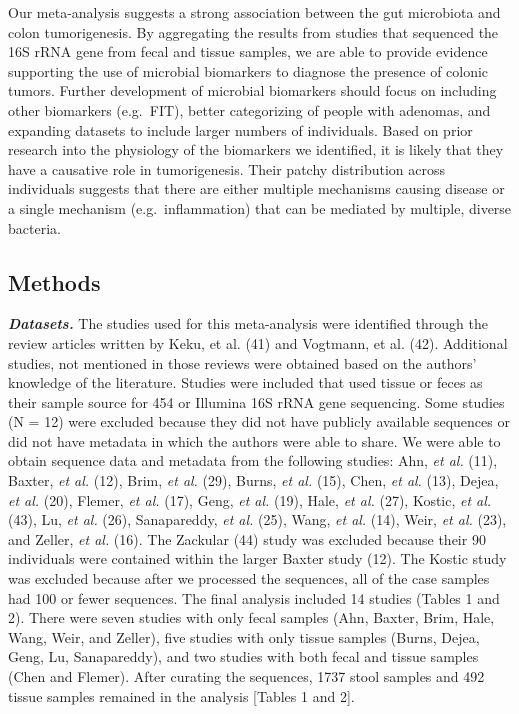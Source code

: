 \documentclass[12pt,]{article}
\begin{document}
Our meta-analysis suggests a strong association between the gut
microbiota and colon tumorigenesis. By aggregating the results from
studies that sequenced the 16S rRNA gene from fecal and tissue samples,
we are able to provide evidence supporting the use of microbial
biomarkers to diagnose the presence of colonic tumors. Further
development of microbial biomarkers should focus on including other
biomarkers (e.g.~FIT), better categorizing of people with adenomas, and
expanding datasets to include larger numbers of individuals. Based on
prior research into the physiology of the biomarkers we identified, it
is likely that they have a causative role in tumorigenesis. Their patchy
distribution across individuals suggests that there are either multiple
mechanisms causing disease or a single mechanism (e.g.~inflammation)
that can be mediated by multiple, diverse bacteria.

\newpage

\subsection{Methods}\label{methods}

\textbf{\emph{Datasets.}} The studies used for this meta-analysis were
identified through the review articles written by Keku, et al. (41) and
Vogtmann, et al. (42). Additional studies, not mentioned in those
reviews were obtained based on the authors' knowledge of the literature.
Studies were included that used tissue or feces as their sample source
for 454 or Illumina 16S rRNA gene sequencing. Some studies (N = 12) were
excluded because they did not have publicly available sequences or did
not have metadata in which the authors were able to share. We were able
to obtain sequence data and metadata from the following studies: Ahn,
\emph{et al.} (11), Baxter, \emph{et al.} (12), Brim, \emph{et al.}
(29), Burns, \emph{et al.} (15), Chen, \emph{et al.} (13), Dejea,
\emph{et al.} (20), Flemer, \emph{et al.} (17), Geng, \emph{et al.}
(19), Hale, \emph{et al.} (27), Kostic, \emph{et al.} (43), Lu, \emph{et
al.} (26), Sanapareddy, \emph{et al.} (25), Wang, \emph{et al.} (14),
Weir, \emph{et al.} (23), and Zeller, \emph{et al.} (16). The Zackular
(44) study was excluded because their 90 individuals were contained
within the larger Baxter study (12). The Kostic study was excluded
because after we processed the sequences, all of the case samples had
100 or fewer sequences. The final analysis included 14 studies (Tables 1
and 2). There were seven studies with only fecal samples (Ahn, Baxter,
Brim, Hale, Wang, Weir, and Zeller), five studies with only tissue
samples (Burns, Dejea, Geng, Lu, Sanapareddy), and two studies with both
fecal and tissue samples (Chen and Flemer). After curating the
sequences, 1737 stool samples and 492 tissue samples remained in the
analysis {[}Tables 1 and 2{]}.
\end{document}
